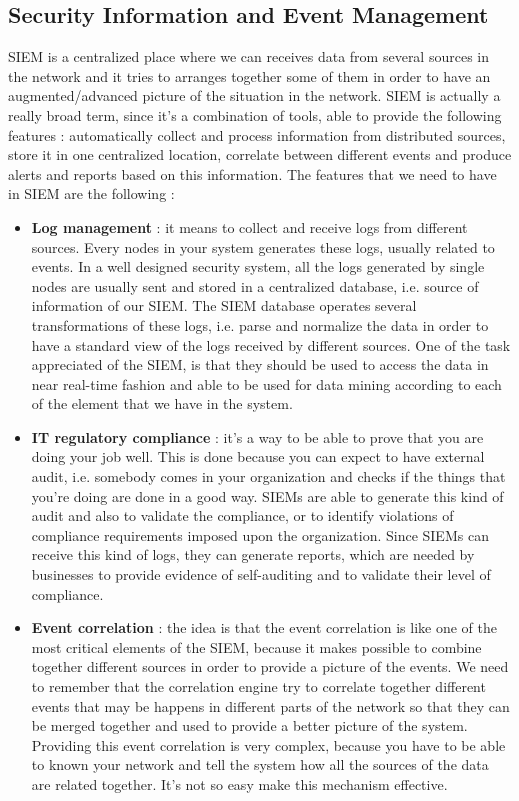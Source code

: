 \documentclass[11pt]{article}
\begin{document}
\subsection{Security Information and Event Management}
SIEM is a centralized place where we can receives data from several sources in the network and it tries to arranges together some of them in order to have an augmented/advanced picture of the situation in the network. SIEM is actually a really broad term, since it's a combination of tools, able to provide the following features : automatically collect and process information from distributed sources, store it in one centralized location, correlate between different events and produce alerts and reports based on this information. The features that we need to have in SIEM are the following :
\begin{itemize}
\item \textbf{Log management} : it means to collect and receive logs from different sources. Every nodes in your system generates these logs, usually related to events. In a well designed security system, all the logs generated by single nodes are usually sent and stored in a centralized database, i.e. source of information of our SIEM. The SIEM database operates several transformations of these logs, i.e. parse and normalize the data in order to have a standard view of the logs received by different sources. One of the task appreciated of the SIEM, is that they should be used to access the data in near real-time fashion and able to be used for data mining according to each of the element that we have in the system.
\item \textbf{IT regulatory compliance} : it's a way to be able to prove that you are doing your job well. This is done because you can expect to have external audit, i.e. somebody comes in your organization and checks if the things that you're doing are done in a good way. SIEMs are able to generate this kind of audit and also to validate the compliance, or to identify violations of compliance requirements imposed upon the organization. Since SIEMs can receive this kind of logs, they can generate reports, which are needed by businesses to provide evidence of self-auditing and to validate their level of compliance.
\item \textbf{Event correlation} : the idea is that the event correlation is like one of the most critical elements of the SIEM, because it makes possible to combine together different sources in order to provide a picture of the events. We need to remember that the correlation engine try to correlate together different events that may be happens in different parts of the network so that they can be merged together and used to provide a better picture of the system. Providing this event correlation is very complex, because you have to be able to known your network and tell the system how all the sources of the data are related together. It's not so easy make this mechanism effective.

\end{itemize}
\end{document}
